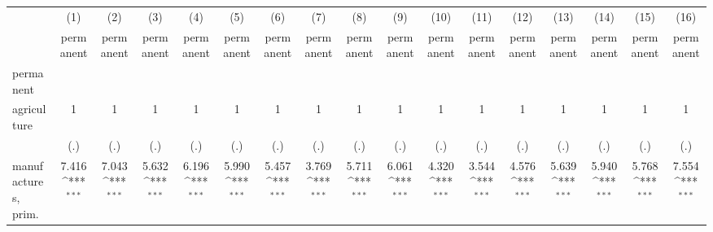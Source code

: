 {
\def\sym#1{\ifmmode^{#1}\else\(^{#1}\)\fi}
\begin{tabular}{l*{16}{c}}
\hline\hline
                    &\multicolumn{1}{c}{(1)}&\multicolumn{1}{c}{(2)}&\multicolumn{1}{c}{(3)}&\multicolumn{1}{c}{(4)}&\multicolumn{1}{c}{(5)}&\multicolumn{1}{c}{(6)}&\multicolumn{1}{c}{(7)}&\multicolumn{1}{c}{(8)}&\multicolumn{1}{c}{(9)}&\multicolumn{1}{c}{(10)}&\multicolumn{1}{c}{(11)}&\multicolumn{1}{c}{(12)}&\multicolumn{1}{c}{(13)}&\multicolumn{1}{c}{(14)}&\multicolumn{1}{c}{(15)}&\multicolumn{1}{c}{(16)}\\
                    &\multicolumn{1}{c}{permanent}&\multicolumn{1}{c}{permanent}&\multicolumn{1}{c}{permanent}&\multicolumn{1}{c}{permanent}&\multicolumn{1}{c}{permanent}&\multicolumn{1}{c}{permanent}&\multicolumn{1}{c}{permanent}&\multicolumn{1}{c}{permanent}&\multicolumn{1}{c}{permanent}&\multicolumn{1}{c}{permanent}&\multicolumn{1}{c}{permanent}&\multicolumn{1}{c}{permanent}&\multicolumn{1}{c}{permanent}&\multicolumn{1}{c}{permanent}&\multicolumn{1}{c}{permanent}&\multicolumn{1}{c}{permanent}\\
\hline
permanent           &                     &                     &                     &                     &                     &                     &                     &                     &                     &                     &                     &                     &                     &                     &                     &                     \\
agriculture         &           1         &           1         &           1         &           1         &           1         &           1         &           1         &           1         &           1         &           1         &           1         &           1         &           1         &           1         &           1         &           1         \\
                    &         (.)         &         (.)         &         (.)         &         (.)         &         (.)         &         (.)         &         (.)         &         (.)         &         (.)         &         (.)         &         (.)         &         (.)         &         (.)         &         (.)         &         (.)         &         (.)         \\
[1em]
manufactures, prim. &       7.416\sym{***}&       7.043\sym{***}&       5.632\sym{***}&       6.196\sym{***}&       5.990\sym{***}&       5.457\sym{***}&       3.769\sym{***}&       5.711\sym{***}&       6.061\sym{***}&       4.320\sym{***}&       3.544\sym{***}&       4.576\sym{***}&       5.639\sym{***}&       5.940\sym{***}&       5.768\sym{***}&       7.554\sym{***}\\

\end{tabular}}
